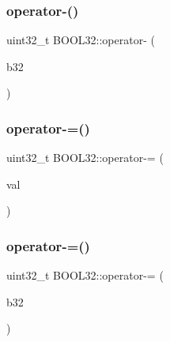 \hypertarget{struct_b_o_o_l32_abfab8de78f49788c07437164a7540a0b}{}\label{struct_b_o_o_l32_abfab8de78f49788c07437164a7540a0b} 
\subsubsection{\texorpdfstring{operator-\/()}{operator-()}\hspace{0.1cm}{\footnotesize\ttfamily [2/2]}}
{\footnotesize\ttfamily uint32\+\_\+t B\+O\+O\+L32\+::operator-\/ (\begin{DoxyParamCaption}\item[{const \hyperlink{struct_b_o_o_l32}{B\+O\+O\+L32}}]{b32 }\end{DoxyParamCaption})\hspace{0.3cm}{\ttfamily [inline]}}

\hypertarget{struct_b_o_o_l32_abf721f5ec88e5f185b6cc709b935e3ad}{}\label{struct_b_o_o_l32_abf721f5ec88e5f185b6cc709b935e3ad} 
\subsubsection{\texorpdfstring{operator-\/=()}{operator-=()}\hspace{0.1cm}{\footnotesize\ttfamily [1/2]}}
{\footnotesize\ttfamily uint32\+\_\+t B\+O\+O\+L32\+::operator-\/= (\begin{DoxyParamCaption}\item[{const uint32\+\_\+t}]{val }\end{DoxyParamCaption})\hspace{0.3cm}{\ttfamily [inline]}}

\hypertarget{struct_b_o_o_l32_a5dceacd5e79d5f79229ccb8fd74ad32c}{}\label{struct_b_o_o_l32_a5dceacd5e79d5f79229ccb8fd74ad32c} 
\subsubsection{\texorpdfstring{operator-\/=()}{operator-=()}\hspace{0.1cm}{\footnotesize\ttfamily [2/2]}}
{\footnotesize\ttfamily uint32\+\_\+t B\+O\+O\+L32\+::operator-\/= (\begin{DoxyParamCaption}\item[{const \hyperlink{struct_b_o_o_l32}{B\+O\+O\+L32}}]{b32 }\end{DoxyParamCaption})\hspace{0.3cm}{\ttfamily [inline]}}

